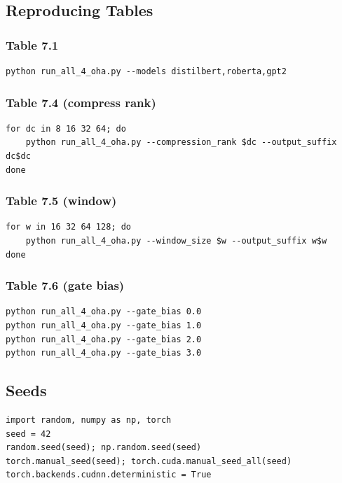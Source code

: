 \subsection{Reproducing Tables}

\subsubsection{Table 7.1}
\begin{lstlisting}
python run_all_4_oha.py --models distilbert,roberta,gpt2
\end{lstlisting}

\subsubsection{Table 7.4 (compress rank)}
\begin{lstlisting}
for dc in 8 16 32 64; do
    python run_all_4_oha.py --compression_rank $dc --output_suffix dc$dc
done
\end{lstlisting}

\subsubsection{Table 7.5 (window)}
\begin{lstlisting}
for w in 16 32 64 128; do
    python run_all_4_oha.py --window_size $w --output_suffix w$w
done
\end{lstlisting}

\subsubsection{Table 7.6 (gate bias)}
\begin{lstlisting}
python run_all_4_oha.py --gate_bias 0.0
python run_all_4_oha.py --gate_bias 1.0
python run_all_4_oha.py --gate_bias 2.0
python run_all_4_oha.py --gate_bias 3.0
\end{lstlisting}

\subsection{Seeds}

\begin{lstlisting}
import random, numpy as np, torch
seed = 42
random.seed(seed); np.random.seed(seed)
torch.manual_seed(seed); torch.cuda.manual_seed_all(seed)
torch.backends.cudnn.deterministic = True
\end{lstlisting}


